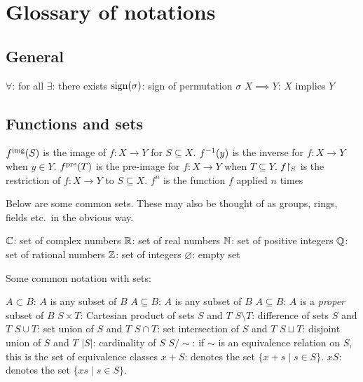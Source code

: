 \chapter{Glossary of notations}

\section{General}
\begin{itemize}
	\ii $\forall$: for all
	\ii $\exists$: there exists
	\ii $\operatorname{sign}(\sigma)$: sign of permutation $\sigma$
	\ii $X \implies Y$: $X$ implies $Y$
\end{itemize}
\section{Functions and sets}
\begin{itemize}
	\ii $f^{\text{img}}(S)$ is the image of $f : X \to Y$ for $S \subseteq X$.
	\ii $f^{-1}(y)$ is the inverse for $f : X \to Y$ when $y \in Y$.
	\ii $f^{\text{pre}}(T)$ is the pre-image for $f : X \to Y$ when $T \subseteq Y$.
	\ii $f \restrict{S}$ is the restriction of $f : X \to Y$ to $S \subseteq X$.
	\ii $f^n$ is the function $f$ applied $n$ times
\end{itemize}

Below are some common sets.
These may also be thought of as groups,
rings, fields etc.\ in the obvious way.
\begin{itemize}
	\ii $\mathbb C$: set of complex numbers
	\ii $\mathbb R$: set of real numbers
	\ii $\mathbb N$: set of positive integers
	\ii $\mathbb Q$: set of rational numbers
	\ii $\mathbb Z$: set of integers
	\ii $\varnothing$: empty set
\end{itemize}

Some common notation with sets:
\begin{itemize}
	\ii $A \subset B$: $A$ is any subset of $B$
	\ii $A \subseteq B$: $A$ is any subset of $B$
	\ii $A \subseteq B$: $A$ is a \emph{proper} subset of $B$
	\ii $S \times T$: Cartesian product of sets $S$ and $T$
	\ii $S \setminus T$: difference of sets $S$ and $T$
	\ii $S \cup T$: set union of $S$ and $T$
	\ii $S \cap T$: set intersection of $S$ and $T$
	\ii $S \sqcup T$: disjoint union of $S$ and $T$
	\ii $\left\lvert S \right\rvert$: cardinality of $S$
	\ii $S / {\sim}$: if $\sim$ is an equivalence relation on $S$,
	this is the set of equivalence classes
	\ii $x + S$: denotes the set $\{x+s \mid s \in S\}$.
	\ii $xS$: denotes the set $\{xs \mid s \in S\}$.
\end{itemize}

